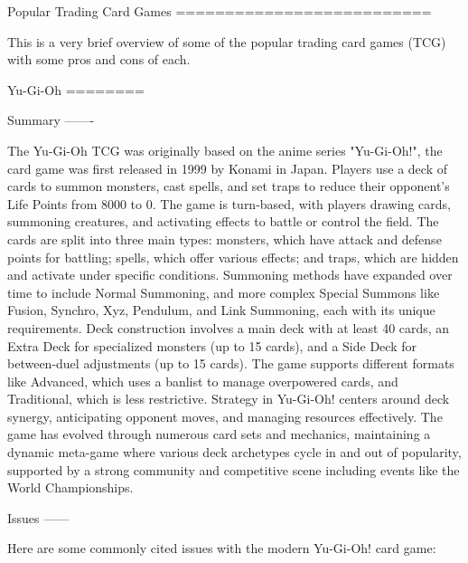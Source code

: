 
Popular Trading Card Games
==========================

This is a very brief overview of some of the popular trading card games (TCG) with some pros and cons of each.


Yu-Gi-Oh
========

Summary
-------

The Yu-Gi-Oh TCG was originally based on the anime series "Yu-Gi-Oh!", the card game was first released in 1999 by Konami in Japan. Players use a deck of cards to summon monsters, cast spells, and set traps to reduce their opponent's Life Points from 8000 to 0. The game is turn-based, with players drawing cards, summoning creatures, and activating effects to battle or control the field. The cards are split into three main types: monsters, which have attack and defense points for battling; spells, which offer various effects; and traps, which are hidden and activate under specific conditions. Summoning methods have expanded over time to include Normal Summoning, and more complex Special Summons like Fusion, Synchro, Xyz, Pendulum, and Link Summoning, each with its unique requirements. Deck construction involves a main deck with at least 40 cards, an Extra Deck for specialized monsters (up to 15 cards), and a Side Deck for between-duel adjustments (up to 15 cards). The game supports different formats like Advanced, which uses a banlist to manage overpowered cards, and Traditional, which is less restrictive. Strategy in Yu-Gi-Oh! centers around deck synergy, anticipating opponent moves, and managing resources effectively. The game has evolved through numerous card sets and mechanics, maintaining a dynamic meta-game where various deck archetypes cycle in and out of popularity, supported by a strong community and competitive scene including events like the World Championships.


Issues
------

Here are some commonly cited issues with the modern Yu-Gi-Oh! card game:

